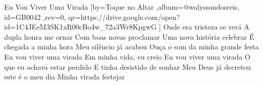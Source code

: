\beginsong
{Eu Vou Viver Uma Virada %
}[by={Toque no Altar %
},album={@walyssondosreis},
id={GB0042 %
},rev={0}, %
qr={https://drive.google.com/open?id=1C4JEeM3SK1xR00cBo4w_72a3Wr8KpgwG %
}]
\beginverse*
Onde era tristeza se verá
A dupla honra me ornar
Com boas novas proclamar
Uma nova história celebrar
\endverse
\beginverse*
É chegada a minha hora
Meu silêncio já acabou
Ouça o som da minha grande festa
\endverse
\beginchorus
Eu vou viver uma virada
Em minha vida, eu creio
Eu vou viver uma virada
\endchorus
\beginverse*
O que eu achava estar perdido
E tinha desistido de sonhar
Meu Deus já decretou este é o meu dia
Minha virada festejar
\endverse

